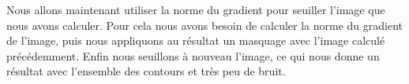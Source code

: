 \documentclass[a4paper,11pt]{article}
\begin{document}
  Nous allons maintenant utiliser la norme du gradient pour seuiller l'image que nous avons calculer. Pour cela nous avons besoin
  de calculer la norme du gradient de l'image, puis nous appliquons au résultat un masquage avec l'image calculé précédemment.
  Enfin nous seuillons à nouveau l'image, ce qui nous donne un résultat avec l'ensemble des contours et très peu de bruit.
\end{document}
